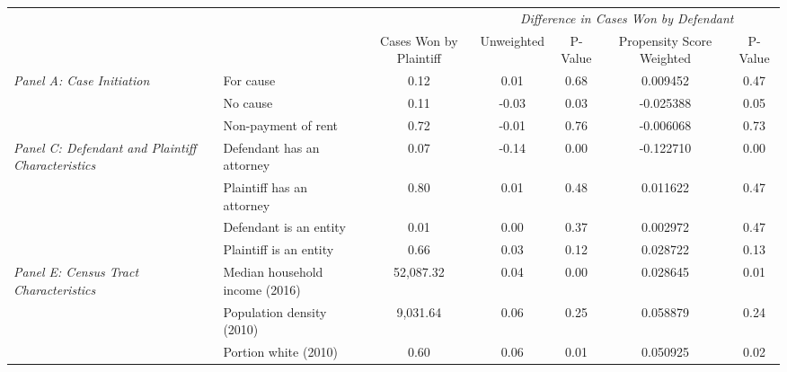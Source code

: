 \begin{tabular}{llccccc}
\toprule
 &  & \textit{} & \multicolumn{4}{|c|}{\textit{Difference in Cases Won by Defendant}} \\
 &  & Cases Won by Plaintiff & Unweighted & P-Value & Propensity Score Weighted & P-Value \\
\midrule
\multirow[c]{3}{3cm}{\textit{Panel A: Case Initiation}} & For cause & 0.12 & 0.01 & 0.68 & 0.009452 & 0.47 \\
 & No cause & 0.11 & -0.03 & 0.03 & -0.025388 & 0.05 \\
 & Non-payment of rent & 0.72 & -0.01 & 0.76 & -0.006068 & 0.73 \\
\cline{1-7}
\multirow[c]{4}{3cm}{\textit{Panel C: Defendant and Plaintiff Characteristics}} & Defendant has an attorney & 0.07 & -0.14 & 0.00 & -0.122710 & 0.00 \\
 & Plaintiff has an attorney & 0.80 & 0.01 & 0.48 & 0.011622 & 0.47 \\
 & Defendant is an entity & 0.01 & 0.00 & 0.37 & 0.002972 & 0.47 \\
 & Plaintiff is an entity & 0.66 & 0.03 & 0.12 & 0.028722 & 0.13 \\
\cline{1-7}
\multirow[c]{3}{3cm}{\textit{Panel E: Census Tract Characteristics}} & Median household income (2016) & 52,087.32 & 0.04 & 0.00 & 0.028645 & 0.01 \\
 & Population density (2010) & 9,031.64 & 0.06 & 0.25 & 0.058879 & 0.24 \\
 & Portion white (2010) & 0.60 & 0.06 & 0.01 & 0.050925 & 0.02 \\
\cline{1-7}
\bottomrule
\end{tabular}
